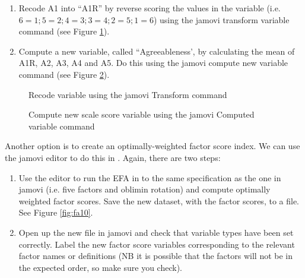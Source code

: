 \begin{enumerate} \itemsep -2pt
\item Recode A1 into “A1R” by reverse scoring the values in the variable (i.e. $6=1; 5=2; 4=3; 3=4; 2=5; 1=6$) using the jamovi transform variable command (see Figure \ref{fig:fa8}).
\item Compute a new variable, called “Agreeableness’,  by calculating the mean of A1R, A2, A3, A4 and A5. Do this using the jamovi compute new variable command (see Figure \ref{fig:fa9}).
\end{enumerate}

\begin{figure}[!htb]
\begin{center}
\caption{Recode variable using the jamovi Transform command}
\label{fig:fa8}
\HR
\end{center}
\end{figure}

\begin{figure}[!htb]
\begin{center}
\caption{Compute new scale score variable using the jamovi Computed variable command}
\label{fig:fa9}
\HR
\end{center}
\end{figure}

Another option is to create an optimally-weighted factor score index. We can use the jamovi  editor to do this in . Again, there are two steps:

\begin{enumerate} \itemsep -2pt
\item Use the  editor to run the EFA in  to the same specification as the one in jamovi (i.e. five factors and oblimin rotation) and compute optimally weighted factor scores. Save the new dataset, with the factor scores, to a file. See Figure \ref{fig:fa10}.
\item Open up the new file in jamovi and check that variable types have been set correctly. Label the new factor score variables corresponding to the relevant factor names or definitions (NB it is possible that the factors will not be in the expected order, so make sure you check).
\end{enumerate}

